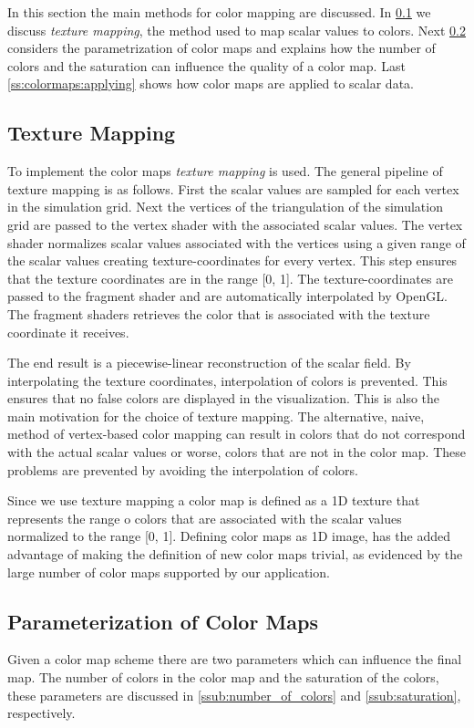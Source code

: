 In this section the main methods for color mapping are discussed. In \cref{sub:texture_mapping} we discuss \emph{texture mapping}, the method used to map scalar values to colors. Next \cref{ss:colormaps:parameterization} considers the parametrization of color maps and explains how the number of colors and the saturation can influence the quality of a color map. Last \cref{ss:colormaps:applying} shows how color maps are applied to scalar data.

\subsection{Texture Mapping} %
\label{sub:texture_mapping}
To implement the color maps \emph{texture mapping} is used. The general pipeline of texture mapping is as follows. First the scalar values are sampled for each vertex in the simulation grid. Next the vertices of the triangulation of the simulation grid are passed to the vertex shader with the associated scalar values. The vertex shader normalizes scalar values associated with the vertices using a given range of the scalar values creating texture-coordinates for every vertex. This step ensures that the texture coordinates are in the range [0, 1]. The texture-coordinates are passed to the fragment shader and are automatically interpolated by OpenGL. The fragment shaders retrieves the color that is associated with the texture coordinate it receives.

The end result is a piecewise-linear reconstruction of the scalar field. By interpolating the texture coordinates, interpolation of colors is prevented.  This ensures that no false colors are displayed in the visualization. This is also the main motivation for the choice of texture mapping. The alternative, naive, method of vertex-based color mapping can result in colors that do not correspond with the actual scalar values or worse, colors that are not in the color map. These problems are prevented by avoiding the interpolation of colors. 

Since we use texture mapping a color map is defined as a 1D texture that represents the range o colors that are associated with the scalar values normalized to the range [0, 1]. Defining color maps as 1D image, has the added advantage of making the definition of new color maps trivial, as evidenced by the large number of color maps supported by our application.

\subsection{Parameterization of Color Maps}
\label{ss:colormaps:parameterization}
Given a color map scheme there are two parameters which can influence the final map. The number of colors in the color map and the saturation of the colors, these parameters are discussed in \cref{ssub:number_of_colors} and \cref{ssub:saturation}, respectively. 


